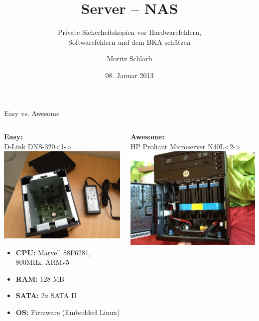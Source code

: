 \documentclass[pdflatex, ngerman]{beamer}
\title[Server NAS]{Server -- NAS}
\subtitle[Kurzform]{Private Sicherheitskopien vor Hardwarefehlern, \\Softwarefehlern und dem BKA schützen}
\author[Moritz Schlarb]{Moritz Schlarb}
\institute[JGU Mainz]{Institut für Informatik\\ Johannes Gutenberg-Universität Mainz}
\date[08.01.2013]{08. Januar 2013}
\begin{document}
\frame{
	\titlepage
}


\begin{frame}{Easy vs. Awesome}
\begin{columns}
\begin{block}{\textbf{Easy:} \\ D-Link DNS-320}<1->
\centering \includegraphics[width=0.9\columnwidth,angle=180]{dns320_.jpg}
\begin{footnotesize}
  \begin{itemize}
    \item \textbf{CPU:} Marvell 88F6281, \\ 800MHz, ARMv5
    \item \textbf{RAM:} 128 MB
    \item \textbf{SATA:} 2x SATA II
    \item \textbf{OS:} Firmware (Embedded Linux)
  \end{itemize}
\end{footnotesize}
\end{block}
\begin{block}{\textbf{Awesome:} \\ HP Proliant Microserver N40L}<2->
\centering \includegraphics[width=0.9\columnwidth,angle=180]{n40l_.jpg}

\end{block}
\end{columns}
\end{frame}
\end{document}
